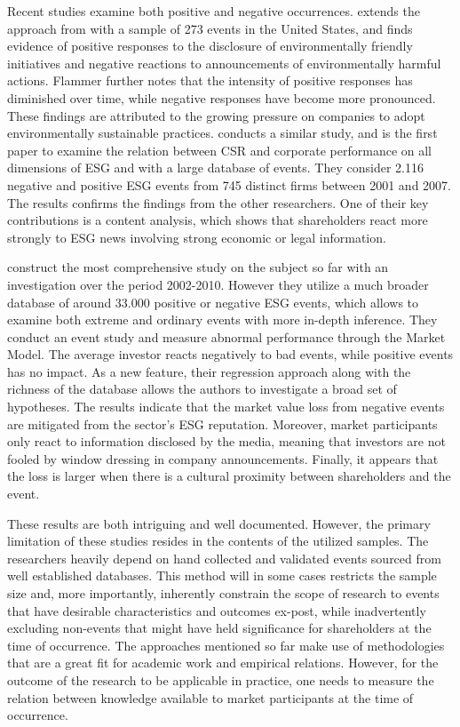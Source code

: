 Recent studies examine both positive and negative occurrences. \cite{flammer2013corporate} extends the approach from \citeauthor{klassen1996impact} with a sample of 273 events in the United States, and finds evidence of positive responses to the disclosure of environmentally friendly initiatives and negative reactions to announcements of environmentally harmful actions. Flammer further notes that the intensity of positive responses has diminished over time, while negative responses have become more pronounced. These findings are attributed to the growing pressure on companies to adopt environmentally sustainable practices. \cite{kruger2015corporate} conducts a similar study, and is the first paper to examine the relation between CSR and corporate performance on all dimensions of ESG and with a large database of events. They consider 2.116 negative and positive ESG events from 745 distinct firms between 2001 and 2007. The results confirms the findings from the other researchers. One of their key contributions is a content analysis, which shows that shareholders react more strongly to ESG news involving strong economic or legal information. 

\cite{Blancard_ESG_sentiment} construct the most comprehensive study on the subject so far with an investigation over the period 2002-2010. However they utilize a much broader database of around 33.000 positive or negative ESG events, which allows to examine both extreme and ordinary events with more in-depth inference. They conduct an event study and measure abnormal performance through the Market Model. The average investor reacts negatively to bad events, while positive events has no impact. As a new feature, their regression approach along with the richness of the database allows the authors to investigate a broad set of hypotheses. The results indicate that the market value loss from negative events are mitigated from the sector's ESG reputation. Moreover, market participants only react to information disclosed by the media, meaning that investors are not fooled by window dressing in company announcements. Finally, it appears that the loss is larger when there is a cultural proximity between shareholders and the event. 

These results are both intriguing and well documented. However, the primary limitation of these studies resides in the contents of the utilized samples. The researchers heavily depend on hand collected and validated events sourced from well established databases. This method will in some cases restricts the sample size and, more importantly, inherently constrain the scope of research to events that have desirable characteristics and outcomes ex-post, while inadvertently excluding non-events that might have held significance for shareholders at the time of occurrence. The approaches mentioned so far make use of methodologies that are a great fit for academic work and empirical relations. However, for the outcome of the research to be applicable in practice, one needs to measure the relation between knowledge available to market participants at the time of occurrence. 

